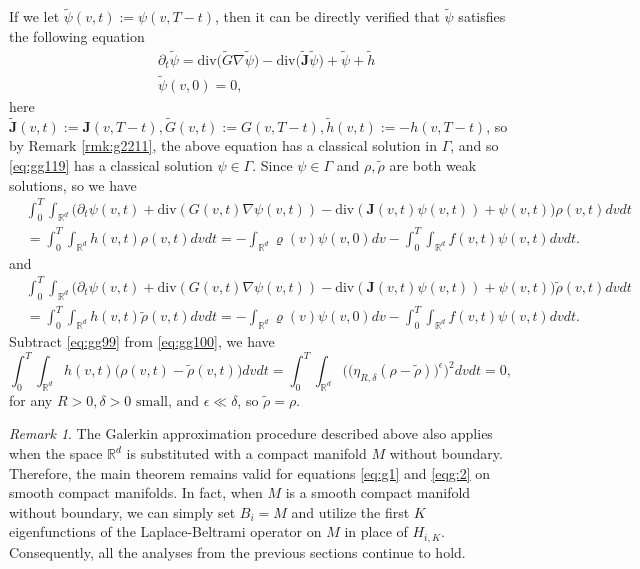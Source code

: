 \documentclass[a4paper, 11pt]{article}
\newcounter{results}[section]
\theoremstyle{plain}
\theoremstyle{remark}
\newtheorem{remark}[results]{Remark}
\theoremstyle{definition}
\renewcommand{\div}{\mathrm{div}}
\newcommand{\intd}{\int_{\mathbb{R}^d}}
\newcommand{\intt}{\int_0^T}
\newcommand{\J}{\boldsymbol{J}}
\begin{document}
    If we let $\tilde{\psi}(v,t):=\psi(v,T-t)$, then it can be directly verified that
	$\tilde{\psi}$ satisfies the following equation
		\begin{equation}
		\begin{aligned}
			&\partial_t{\tilde{\psi}}=\div\Big(\tilde{G}\nabla\tilde{\psi}\Big)-\div\Big(\tilde{\J}\tilde{\psi}\Big)+\tilde{\psi}+\tilde{h}\\
			&\tilde{\psi}(v,0)=0,
		\end{aligned}
	\end{equation}
	here $\tilde{\J}(v,t):=\J(v,T-t),\tilde{G}(v,t):=G(v,T-t),\tilde{h}(v,t):=-h(v,T-t)$, so by Remark \ref{rmk:g2211}, the above equation has a classical solution in $\Gamma$, and so \eqref{eq:gg119} has a classical solution $\psi\in\Gamma$. Since ${\psi}\in \Gamma$ and $\rho,\tilde{\rho}$ are both weak solutions, so we have
	    \begin{equation}\label{eq:gg99}
        \begin{aligned}
            &\intt\intd\Big(\partial_t\psi(v,t)+\div(G(v,t)\nabla\psi(v,t))-\div({\J(v,t)}{\psi(v,t)})+\psi(v,t)\Big)\rho(v,t)dvdt\\
            &=\intt\intd h(v,t)\rho(v,t)dvdt=-\intd\varrho(v)\psi(v,0)dv-\intt\intd f(v,t)\psi(v,t)dvdt.
        \end{aligned}
    \end{equation}
	and
		    \begin{equation}\label{eq:gg100}
        \begin{aligned}
            &\intt\intd\Big(\partial_t\psi(v,t)+\div(G(v,t)\nabla\psi(v,t))-\div({\J(v,t)}{\psi(v,t)})+\psi(v,t)\Big)\tilde{\rho}(v,t)dvdt\\
            &=\intt\intd h(v,t)\tilde{\rho}(v,t)dvdt=-\intd\varrho(v)\psi(v,0)dv-\intt\intd f(v,t)\psi(v,t)dvdt.
        \end{aligned}
    \end{equation}
Subtract \eqref{eq:gg99} from \eqref{eq:gg100}, we have
	\begin{equation}
		\intt\intd h(v,t)\Big(\rho(v,t)-\tilde{\rho}(v,t)\Big)dvdt=\intt\intd \Big(\Big(\eta_{R,\delta}(\rho-\tilde{\rho})\Big)^{\epsilon}\Big)^2dvdt=0,
	\end{equation}
	for any $R>0,\delta>0\text{ small, and }\epsilon\ll\delta$, so $\tilde{\rho}=\rho$.
\begin{remark}\label{rmk:rmk220}
The Galerkin approximation procedure described above also applies when the space $\mathbb{R}^d$ is substituted with a compact manifold $M$ {without boundary}. Therefore, the main theorem remains valid for equations \eqref{eq:g1} and \eqref{eqg:2} on smooth compact manifolds. In fact, when $M$ is a smooth compact manifold {without boundary}, we can simply set $B_i=M$ and utilize the first $K$ eigenfunctions of the Laplace-Beltrami operator on $M$ in place of $H_{i,K}$. Consequently, all the analyses from the previous sections continue to hold.
\end{remark}
\end{document}

